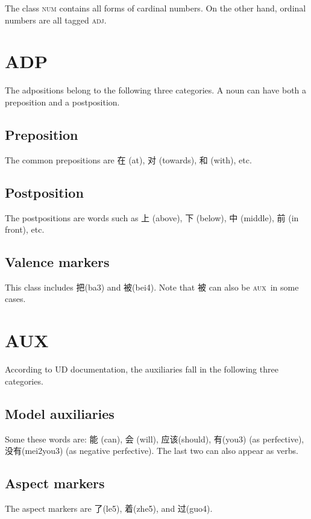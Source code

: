 \documentclass[UTF8,oneside]{book}
\def\aux{\textsc{aux}}
\def\adj{\textsc{adj}}
\begin{document}
The class \textsc{num} contains all forms of cardinal numbers. On the other hand, ordinal numbers are all tagged \adj. 

\section{ADP}

The adpositions belong to the following three categories. A noun can have both a preposition and a postposition. 

\subsection{Preposition}

The common prepositions are 在 (at), 对 (towards), 和 (with), etc.

\subsection{Postposition}

The postpositions are words such as 上 (above), 下 (below), 中 (middle), 前 (in front), etc.

\subsection{Valence markers}

This class includes 把(ba3) and 被(bei4). Note that 被 can also be \aux\ in some cases.

\section{AUX}

According to UD documentation, the auxiliaries fall in the following three categories. 

\subsection{Model auxiliaries}

Some these words are: 能 (can), 会 (will), 应该(should), 有(you3) (as perfective), 没有(mei2you3) (as negative perfective). The last two can also appear as verbs.

\subsection{Aspect markers}

The aspect markers are 了(le5), 着(zhe5), and 过(guo4).
\end{document}
